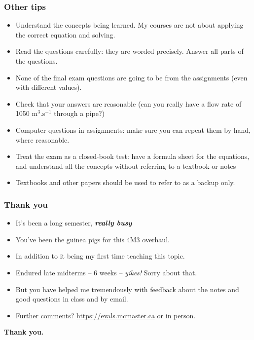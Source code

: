 \begin{frame}\frametitle{Other tips}
	\begin{itemize}
		\item	Understand the concepts being learned. My courses are not about applying the correct equation and solving.
		\item	Read the questions carefully: they are worded precisely. Answer all parts of the questions.
		\item	None of the final exam questions are going to be from the assignments (even with different values).
		\item	Check that your answers are reasonable (can you really have a flow rate of 1050 \(\text{m}^3.\text{s}^{-1}\) through a pipe?)
		\item	Computer questions in assignments: make sure you can repeat them by hand, where reasonable.
	\end{itemize}
	\begin{exampleblock}{{\color{myRed}{Most important advice}}}
		\begin{itemize}
			\item	Treat the exam as a closed-book test: have a formula sheet for the equations, and understand all the concepts without referring to a textbook or notes
			\item	Textbooks and other papers should be used to refer to as a backup only.
		\end{itemize}
	\end{exampleblock}
\end{frame}

\begin{frame}\frametitle{Thank you}
	\begin{itemize}
		\item	It's been a long semester, \textbf{\emph{really busy}}
		\item	You've been the guinea pigs for this 4M3 overhaul.
		\item	In addition to it being my first time teaching this topic.
		\item	Endured late midterms -- 6 weeks -- \emph{yikes!} Sorry about that.
		\item	But you have helped me tremendously with feedback about the notes and good questions in class and by email.
		\item	Further comments? \href{https://evals.mcmaster.ca}{https://evals.mcmaster.ca} or in person.
	\end{itemize}
	\vspace{12pt}
	\textbf{Thank you.}
\end{frame}